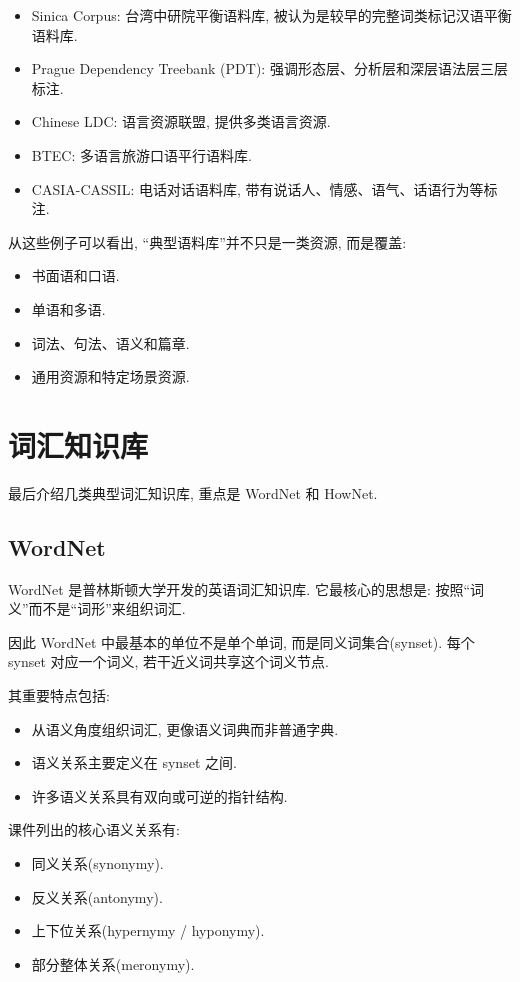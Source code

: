 \begin{itemize}
\item Sinica Corpus: 台湾中研院平衡语料库, 被认为是较早的完整词类标记汉语平衡语料库.
\item Prague Dependency Treebank (PDT): 强调形态层、分析层和深层语法层三层标注.
\item Chinese LDC: 语言资源联盟, 提供多类语言资源.
\item BTEC: 多语言旅游口语平行语料库.
\item CASIA-CASSIL: 电话对话语料库, 带有说话人、情感、语气、话语行为等标注.
\end{itemize}

从这些例子可以看出, “典型语料库”并不只是一类资源, 而是覆盖:

\begin{itemize}
\item 书面语和口语.
\item 单语和多语.
\item 词法、句法、语义和篇章.
\item 通用资源和特定场景资源.
\end{itemize}

\section{词汇知识库}


最后介绍几类典型词汇知识库, 重点是 WordNet 和 HowNet.

\subsection{WordNet}


WordNet 是普林斯顿大学开发的英语词汇知识库.
它最核心的思想是: 按照“词义”而不是“词形”来组织词汇.

因此 WordNet 中最基本的单位不是单个单词, 而是同义词集合(synset).
每个 synset 对应一个词义, 若干近义词共享这个词义节点.

其重要特点包括:

\begin{itemize}
\item 从语义角度组织词汇, 更像语义词典而非普通字典.
\item 语义关系主要定义在 synset 之间.
\item 许多语义关系具有双向或可逆的指针结构.
\end{itemize}

课件列出的核心语义关系有:

\begin{itemize}
\item 同义关系(synonymy).
\item 反义关系(antonymy).
\item 上下位关系(hypernymy / hyponymy).
\item 部分整体关系(meronymy).
\end{itemize}

